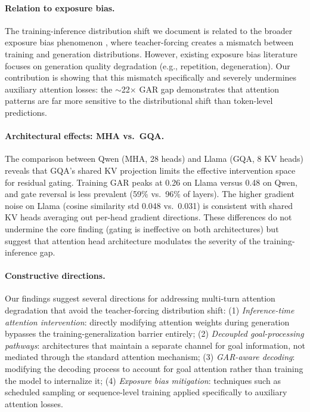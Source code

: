 \documentclass[11pt,a4paper]{article}
\begin{document}
\paragraph{Relation to exposure bias.}
The training-inference distribution shift we document is related to the broader exposure bias phenomenon \cite{ranzato2016sequence,bengio2015scheduled}, where teacher-forcing creates a mismatch between training and generation distributions. However, existing exposure bias literature focuses on generation quality degradation (e.g., repetition, degeneration). Our contribution is showing that this mismatch specifically and severely undermines auxiliary attention losses: the $\sim$22$\times$ GAR gap demonstrates that attention patterns are far more sensitive to the distributional shift than token-level predictions.

\paragraph{Architectural effects: MHA vs.\ GQA.}
The comparison between Qwen (MHA, 28 heads) and Llama (GQA, 8 KV heads) reveals that GQA's shared KV projection limits the effective intervention space for residual gating. Training GAR peaks at 0.26 on Llama versus 0.48 on Qwen, and gate reversal is less prevalent (59\% vs.\ 96\% of layers). The higher gradient noise on Llama (cosine similarity std 0.048 vs.\ 0.031) is consistent with shared KV heads averaging out per-head gradient directions. These differences do not undermine the core finding (gating is ineffective on both architectures) but suggest that attention head architecture modulates the severity of the training-inference gap.

\paragraph{Constructive directions.}
Our findings suggest several directions for addressing multi-turn attention degradation that avoid the teacher-forcing distribution shift:
(1) \emph{Inference-time attention intervention}: directly modifying attention weights during generation bypasses the training-generalization barrier entirely;
(2) \emph{Decoupled goal-processing pathways}: architectures that maintain a separate channel for goal information, not mediated through the standard attention mechanism;
(3) \emph{GAR-aware decoding}: modifying the decoding process to account for goal attention rather than training the model to internalize it;
(4) \emph{Exposure bias mitigation}: techniques such as scheduled sampling \cite{bengio2015scheduled} or sequence-level training \cite{ranzato2016sequence} applied specifically to auxiliary attention losses.
\end{document}
